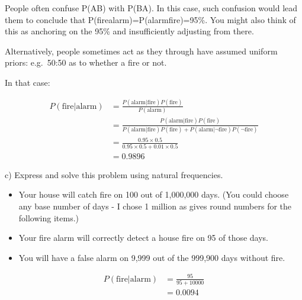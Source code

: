 \documentclass[
  letterpaper,
  DIV=11,
  numbers=noendperiod]{scrreprt}
\begin{document}
\begin{tcolorbox}[enhanced jigsaw, title=\textcolor{quarto-callout-tip-color}{\faLightbulb}\hspace{0.5em}{Answer}, toprule=.15mm, colback=white, breakable, titlerule=0mm, colframe=quarto-callout-tip-color-frame, coltitle=black, opacityback=0, rightrule=.15mm, colbacktitle=quarto-callout-tip-color!10!white, bottomtitle=1mm, opacitybacktitle=0.6, arc=.35mm, bottomrule=.15mm, toptitle=1mm, leftrule=.75mm, left=2mm]

People often confuse P(A\textbar B) with P(B\textbar A). In this case,
such confusion would lead them to conclude that
P(fire\textbar alarm)=P(alarm\textbar fire)=95\%. You might also think
of this as anchoring on the 95\% and insufficiently adjusting from
there.

Alternatively, people sometimes act as they through have assumed uniform
priors: e.g.~50:50 as to whether a fire or not.

In that case:

\begin{align*}
P(\text{fire}|\text{alarm})&=\frac{P(\text{alarm}|\text{fire})P(\text{fire})}{P(\text{alarm})} \\[6pt]
&=\frac{P(\text{alarm}|\text{fire})P(\text{fire})}{P(\text{alarm}|\text{fire})P(\text{fire})+P(\text{alarm}|\neg\text{fire})P(\neg\text{fire})} \\[6pt]
&=\frac{0.95\times 0.5}{0.95\times 0.5+0.01\times 0.5} \\[6pt]
&=0.9896
\end{align*}

\end{tcolorbox}

c) Express and solve this problem using natural frequencies.

\begin{tcolorbox}[enhanced jigsaw, title=\textcolor{quarto-callout-tip-color}{\faLightbulb}\hspace{0.5em}{Answer}, toprule=.15mm, colback=white, breakable, titlerule=0mm, colframe=quarto-callout-tip-color-frame, coltitle=black, opacityback=0, rightrule=.15mm, colbacktitle=quarto-callout-tip-color!10!white, bottomtitle=1mm, opacitybacktitle=0.6, arc=.35mm, bottomrule=.15mm, toptitle=1mm, leftrule=.75mm, left=2mm]

\begin{itemize}
\item
  Your house will catch fire on 100 out of 1,000,000 days. (You could
  choose any base number of days - I chose 1 million as gives round
  numbers for the following items.)
\item
  Your fire alarm will correctly detect a house fire on 95 of those
  days.
\item
  You will have a false alarm on 9,999 out of the 999,900 days without
  fire.
\end{itemize}

\begin{align*}
P(\text{fire}|\text{alarm})&=\frac{95}{95+10000} \\[6pt]
&=0.0094
\end{align*}

\end{tcolorbox}
\end{document}
